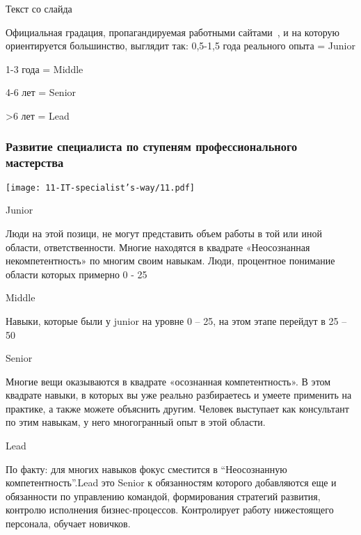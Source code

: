 \documentclass{../industrial-development}
\begin{document}
\lecturenotes

Текст со слайда~\cite{JMSL}

Официальная градация, пропагандируемая работными сайтами~\cite{hh}, и на которую ориентируется большинство, выглядит так:
	0,5-1,5 года реального опыта = Junior

	1-3 года = Middle 

	4-6 лет = Senior

	>6 лет = Lead


\begin{frame} \frametitle{Развитие  специалиста по ступеням профессионального мастерства}
 \centerline{\texttt{[image: 11-IT-specialist's-way/11.pdf]}}

\end{frame}

\lecturenotes

Junior~\cite{JMSL}

Люди на этой позици, не могут представить объем работы в той или иной области, ответственности. Многие находятся в квадрате «Неосознанная некомпетентность» по многим своим навыкам. Люди, процентное понимание области которых примерно 0 - 25%

Middle 

Навыки, которые были у junior на уровне 0 – 25, на этом этапе перейдут в 25 – 50%

Senior

Многие вещи оказываются в квадрате «осознанная компетентность». В этом квадрате навыки, в которых вы уже реально разбираетесь и умеете применить на практике, а также можете объяснить другим. Человек выступает как консультант по этим навыкам, у него многогранный опыт в этой области.

Lead

По факту: для многих навыков фокус сместится в “Неосознанную компетентность”.Lead это Senior к обязанностям которого добавляются еще и обязанности по управлению командой, формирования стратегий развития, контролю исполнения бизнес-процессов. Контролирует работу нижестоящего персонала, обучает новичков.


\end{document}
